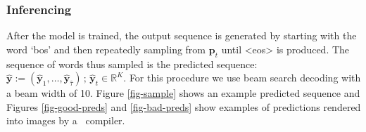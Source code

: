 \documentclass{article}
\begin{document}
\subsubsection{Inferencing}
After the model is trained, the output sequence is generated by starting with the word `bos' and then repeatedly sampling from $\boldsymbol{p}_t$ until <eos> is produced. The sequence of words thus sampled is the predicted sequence: $\boldsymbol{\hat{y}} := ( \boldsymbol{\hat{y}}_1, \ldots, \boldsymbol{\hat{y}}_{\hat{\tau}} ) \, ; \, \boldsymbol{\hat{y}}_{t} \in \mathbb{R}^K$.  For this procedure we use beam search decoding \cite{Graves2008SupervisedSL} with a beam width of 10. Figure \ref{fig-sample} shows an example predicted sequence and Figures \ref{fig-good-preds} and \ref{fig-bad-preds} show examples of predictions rendered into images by a \LaTeXe ~compiler.

\end{document}
